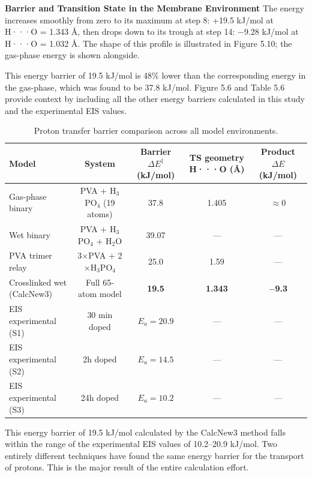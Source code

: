 \documentclass[12pt,a4paper]{report}
\begin{document}
\textbf{Barrier and Transition State in the Membrane Environment}
The energy increases smoothly from zero to its maximum at step 8: +19.5 kJ/mol at H···O = 1.343 Å, then drops down to its trough at step 14: \(-9.28\) kJ/mol at H···O = 1.032 Å. The shape of this profile is illustrated in Figure 5.10; the gas-phase energy is shown alongside.

This energy barrier of 19.5 kJ/mol is 48\% lower than the corresponding energy in the gas-phase, which was found to be 37.8 kJ/mol. Figure 5.6 and Table 5.6 provide context by including all the other energy barriers calculated in this study and the experimental EIS values.

\begin{table}[h!]
\centering
\caption{Proton transfer barrier comparison across all model environments.}
\label{tab:barrier-comparison}
\footnotesize   %
\setlength{\tabcolsep}{3pt}  %
\begin{tabular}{l c c c c}
\toprule
Model & System & Barrier \(\Delta E^{\ddagger}\) (kJ/mol) & TS geometry H···O (Å) & Product \(\Delta E\) (kJ/mol) \\
\midrule
Gas-phase binary & PVA + H\(_3\)PO\(_4\) (19 atoms) & 37.8 & 1.405 & \(\approx 0\) \\
Wet binary & PVA + H\(_3\)PO\(_4\) + H\(_2\)O & 39.07 & --- & --- \\
PVA trimer relay & 3\(\times\)PVA + 2\(\times\)H\(_3\)PO\(_4\) & 25.0 & 1.59 & --- \\
Crosslinked wet (CalcNew3) & Full 65-atom model & \textbf{19.5} & \textbf{1.343} & \textbf{\(-\)9.3} \\
EIS experimental (S1) & 30 min doped & \(E_a = 20.9\) & --- & --- \\
EIS experimental (S2) & 2h doped & \(E_a = 14.5\) & --- & --- \\
EIS experimental (S3) & 24h doped & \(E_a = 10.2\) & --- & --- \\
\bottomrule
\end{tabular}
\end{table}

This energy barrier of 19.5 kJ/mol calculated by the CalcNew3 method falls within the range of the experimental EIS values of 10.2–20.9 kJ/mol. Two entirely different techniques have found the same energy barrier for the transport of protons. This is the major result of the entire calculation effort.\cite{65, 66, 72, 73}
\end{document}
